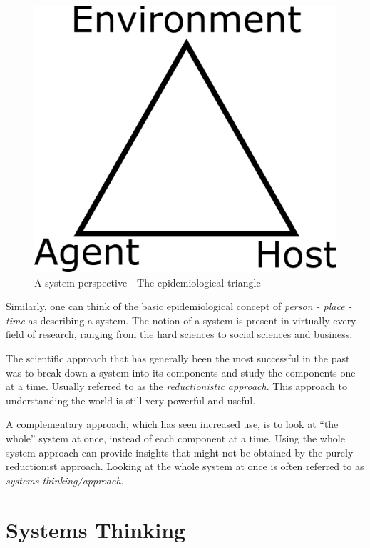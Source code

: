 \documentclass[]{book}
\theoremstyle{definition}
\theoremstyle{definition}
\theoremstyle{definition}
\theoremstyle{remark}
\begin{document}
\begin{figure}
\centering
\includegraphics{./images/epi-triangle.png}
\caption{\label{fig:epitriangle}A system perspective - The epidemiological
triangle}
\end{figure}

Similarly, one can think of the basic epidemiological concept of
\emph{person - place - time} as describing a system. The notion of a
system is present in virtually every field of research, ranging from the
hard sciences to social sciences and business.

The scientific approach that has generally been the most successful in
the past was to break down a system into its components and study the
components one at a time. Usually referred to as the
\emph{reductionistic approach}. This approach to understanding the world
is still very powerful and useful.

A complementary approach, which has seen increased use, is to look at
``the whole'' system at once, instead of each component at a time. Using
the whole system approach can provide insights that might not be
obtained by the purely reductionist approach. Looking at the whole
system at once is often referred to as \emph{systems thinking/approach}.

\section{Systems Thinking}\label{systems-thinking}
\end{document}
